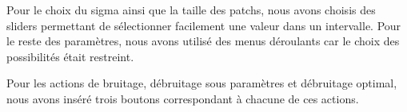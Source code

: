 Pour le choix du sigma ainsi que la taille des patchs, nous avons choisis des sliders permettant de sélectionner facilement une valeur dans un intervalle. Pour le reste des paramètres, nous avons utilisé des menus déroulants car le choix des possibilités était restreint. \par
Pour les actions de bruitage, débruitage sous paramètres et débruitage optimal, nous avons inséré trois boutons correspondant à chacune de ces actions. \par

